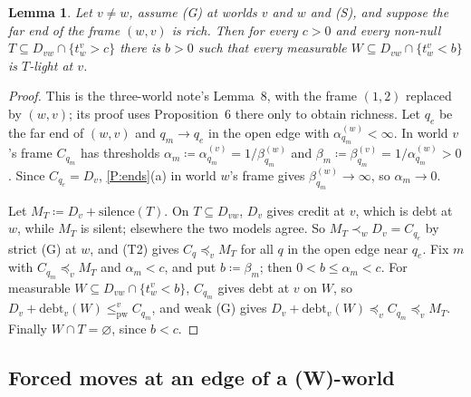 \documentclass[11pt]{article}
\newtheorem{lemma}[theorem]{Lemma}
\theoremstyle{definition}\newtheorem{definition}[theorem]{Definition}
\theoremstyle{remark}\newtheorem{remark}[theorem]{Remark}
\newcommand{\debt}{\mathrm{debt}}
\newcommand{\sil}{\mathrm{silence}}
\newcommand{\pw}{\mathrm{pw}}
\begin{document}
\begin{lemma}\label{lem:near}
Let $v\ne w$, assume (G) at worlds $v$ and $w$ and (S), and suppose the far
end of the frame $(w,v)$ is rich. Then for every $c>0$ and every non-null
$T\subseteq D_{vw}\cap\{t^v_w>c\}$ there is $b>0$ such that every measurable
$W\subseteq D_{vw}\cap\{t^v_w<b\}$ is $T$-light at $v$.
\end{lemma}
\begin{proof}
This is the three-world note's Lemma~8, with the frame $(1,2)$ replaced by
$(w,v)$; its proof uses Proposition~6 there only to obtain richness. Let
$q_e$ be the far end of $(w,v)$ and $q_m\to q_e$ in the open edge with
$\alpha^{(w)}_{q_m}<\infty$. In world $v$'s frame $C_{q_m}$ has thresholds
$\alpha_m\coloneqq\alpha^{(v)}_{q_m}=1/\beta^{(w)}_{q_m}$ and
$\beta_m\coloneqq\beta^{(v)}_{q_m}=1/\alpha^{(w)}_{q_m}>0$. Since
$C_{q_e}=D_v$, \ref{P:ends}(a) in world $w$'s frame gives
$\beta^{(w)}_{q_m}\to\infty$, so $\alpha_m\to0$.

Let $M_T\coloneqq D_v+\sil(T)$. On $T\subseteq D_{vw}$, $D_v$ gives credit
at $v$, which is debt at $w$, while $M_T$ is silent; elsewhere the two
models agree. So $M_T\prec_wD_v=C_{q_e}$ by strict (G) at $w$, and (T2)
gives $C_q\preceq_vM_T$ for all $q$ in the open edge near $q_e$. Fix $m$
with $C_{q_m}\preceq_vM_T$ and $\alpha_m<c$, and put $b\coloneqq\beta_m$;
then $0<b\le\alpha_m<c$. For measurable $W\subseteq
D_{vw}\cap\{t^v_w<b\}$, $C_{q_m}$ gives debt at $v$ on $W$, so
$D_v+\debt_v(W)\le^v_\pw C_{q_m}$, and weak (G) gives
$D_v+\debt_v(W)\preceq_vC_{q_m}\preceq_vM_T$. Finally $W\cap
T=\varnothing$, since $b<c$.
\end{proof}

\subsection{Forced moves at an edge of a (W)-world}\label{sec:forced}
\end{document}
